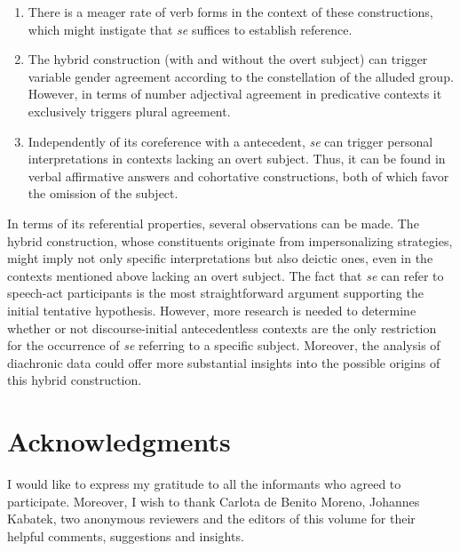 \documentclass[output=paper]{langscibook}
\begin{document}
\begin{enumerate}
 \item There is a meager rate of  verb forms in the context of these constructions, which might instigate that \textit{se} suffices to establish  reference.
 \item The hybrid construction (with and without the overt subject) can trigger variable gender agreement according to the constellation of the alluded group. However, in terms of number adjectival agreement in predicative contexts it exclusively triggers plural agreement.
 \item Independently of its coreference with a  antecedent, \textit{se} can trigger personal interpretations in contexts lacking an overt subject. Thus, it can be found in verbal affirmative answers and cohortative constructions, both of which favor the omission of the subject. 
\end{enumerate}

In terms of its referential properties, several observations can be made. The hybrid construction, whose constituents originate from impersonalizing strategies, might imply not only specific interpretations but also deictic ones, even in the contexts mentioned above lacking an overt subject. The fact that \textit{se} can refer to speech-act participants is the most straightforward argument supporting the initial tentative hypothesis. However, more research is needed to determine whether or not discourse-initial antecedentless contexts are the only restriction for the occurrence of \textit{se} referring to a specific  subject. Moreover, the analysis of diachronic data could offer more substantial insights into the possible origins of this hybrid construction.

\section*{Acknowledgments}
I would like to express my gratitude to all the informants who agreed to participate. Moreover, I wish to thank Carlota de Benito Moreno, Johannes Kabatek, two anonymous reviewers and the editors of this volume for their helpful comments, suggestions and insights. 

\printbibliography[heading=subbibliography]
\end{document}
